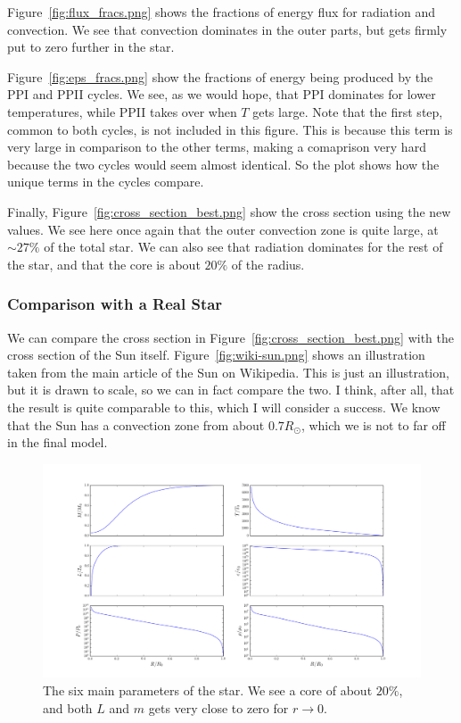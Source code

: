 \documentclass[11pt]{article}
\begin{document}
Figure~\ref{fig:flux_fracs.png} shows the fractions of energy flux for radiation and convection. We see that convection dominates in the outer parts, but gets firmly put to zero further in the star.

Figure~\ref{fig:eps_fracs.png} show the fractions of energy being produced by the PPI and PPII cycles. We see, as we would hope, that PPI dominates for lower temperatures, while PPII takes over when $T$ gets large. Note that the first step, common to both cycles, is not included in this figure. This is because this term is very large in comparison to the other terms, making a comaprison very hard because the two cycles would seem almost identical. So the plot shows how the unique terms in the cycles compare. 

Finally, Figure~\ref{fig:cross_section_best.png} show the cross section using the new values. We see here once again that the outer convection zone is quite large, at $\sim 27\%$ of the total star. We can also see that radiation dominates for the rest of the star, and that the core is about $20\%$ of the radius. 

\subsubsection{Comparison with a Real Star}

We can compare the cross section in Figure~\ref{fig:cross_section_best.png} with the cross section of the Sun itself. Figure~\ref{fig:wiki-sun.png} shows an illustration taken from the main article of the Sun on Wikipedia. This is just an illustration, but it is drawn to scale, so we can in fact compare the two. I think, after all, that the result is quite comparable to this, which I will consider a success. We know that the Sun has a convection zone from about $0.7R_\odot$, which we is not to far off in the final model.  


\begin{figure}
    \center
    \includegraphics[width=\linewidth]{fig/main_params.png}
    \caption{\label{fig:main_params.png} The six main parameters of the star. We see a core of about $20\%$, and both $L$ and $m$ gets very close to zero for $r\rightarrow 0$. }
\end{figure}
\end{document}
